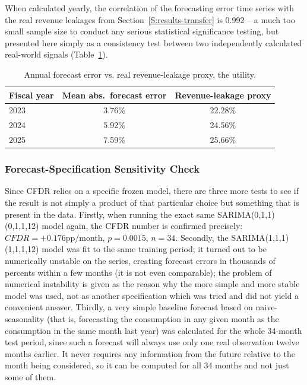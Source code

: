 \documentclass[final,1p,times]{elsarticle}
\begin{document}
When calculated yearly, the correlation of the forecasting error time series with the real revenue leakages from Section~\ref{S:results-transfer} is 0.992 -- a much too small sample size to conduct any serious statistical significance testing, but presented here simply as a consistency test between two independently calculated real-world signals (Table~\ref{tab:forecast-annual}).
\begin{table}[h]
\centering
\small
\caption{Annual forecast error vs. real revenue-leakage proxy, the utility.}
\label{tab:forecast-annual}
\begin{tabular}{lcc}
\toprule
\textbf{Fiscal year} & \textbf{Mean abs.\ forecast error} & \textbf{Revenue-leakage proxy} \\
\midrule
2023 & 3.76\% & 22.28\% \\
2024 & 5.92\% & 24.56\% \\
2025 & 7.59\% & 25.66\% \\
\bottomrule
\end{tabular}
\end{table}

\subsubsection{Forecast-Specification Sensitivity Check}
\label{S:forecast-sensitivity}

Since CFDR relies on a specific frozen model, there are three more tests to see if the result is not simply a product of that particular choice but something that is present in the data. Firstly, when running the exact same SARIMA(0,1,1)(0,1,1,12) model again, the CFDR number is confirmed precisely: $CFDR = +0.176$pp/month, $p = 0.0015$, $n = 34$. Secondly, the SARIMA(1,1,1)(1,1,1,12) model was fit to the same training period; it turned out to be numerically unstable on the series, creating forecast errors in thousands of percents within a few months (it is not even comparable); the problem of numerical instability is given as the reason why the more simple and more stable model was used, not as another specification which was tried and did not yield a convenient answer. Thirdly, a very simple baseline forecast based on naive-seasonality (that is, forecasting the consumption in any given month as the consumption in the same month last year) was calculated for the whole 34-month test period, since such a forecast will always use only one real observation twelve months earlier. It never requires any information from the future relative to the month being considered, so it can be computed for all 34 months and not just some of them.
\end{document}
